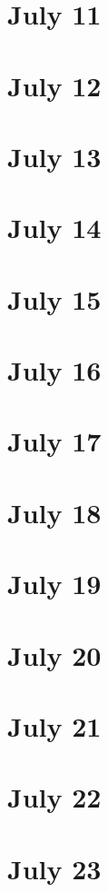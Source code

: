 \section{July 11}

\section{July 12}

\section{July 13}

\section{July 14}

\section{July 15}

\section{July 16}

\section{July 17}

\section{July 18}

\section{July 19}

\section{July 20}

\section{July 21}

\section{July 22}

\section{July 23}

